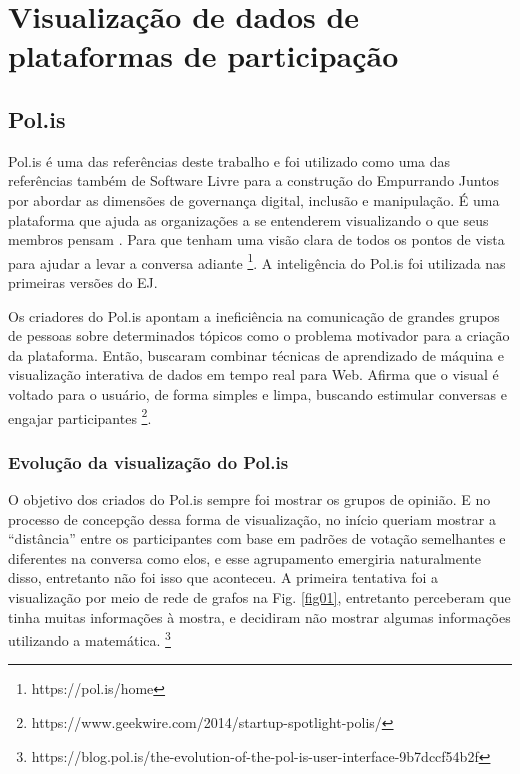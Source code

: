 \chapter{Visualização de dados de plataformas de participação}
\section{Pol.is}

Pol.is é uma das referências deste trabalho e foi utilizado como uma das referências também de Software Livre para a construção do Empurrando Juntos por abordar as dimensões de governança digital, inclusão e manipulação. É uma plataforma que ajuda as organizações a se entenderem visualizando o que seus membros pensam \cite{poppi2017}. Para que tenham uma visão clara de todos os pontos de vista para ajudar a levar a conversa adiante \footnote{https://pol.is/home}. A inteligência do Pol.is foi utilizada nas primeiras versões do EJ.

Os criadores do Pol.is apontam a ineficiência na comunicação de grandes grupos de pessoas sobre determinados tópicos como o problema motivador para a criação da plataforma. Então, buscaram combinar técnicas de aprendizado de máquina e visualização interativa de dados em tempo real para Web. Afirma que o visual é voltado para o usuário, de forma simples e limpa, buscando estimular conversas e engajar participantes \footnote{https://www.geekwire.com/2014/startup-spotlight-polis/}.



\subsection{Evolução da visualização do Pol.is}

O objetivo dos criados do Pol.is sempre foi mostrar os grupos de opinião. E no processo de concepção dessa forma de visualização, no início queriam mostrar a “distância” entre os participantes com base em padrões de votação semelhantes e diferentes na conversa como elos, e esse agrupamento emergiria naturalmente disso, entretanto não foi isso que aconteceu. A primeira tentativa foi a visualização por meio de rede de grafos na Fig. \ref{fig01}, entretanto perceberam que tinha muitas informações à mostra, e decidiram não mostrar algumas informações utilizando a matemática. \footnote{https://blog.pol.is/the-evolution-of-the-pol-is-user-interface-9b7dccf54b2f}


